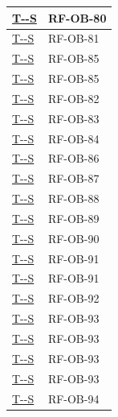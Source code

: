 \documentclass[a4paper,12pt]{article}
\newcounter{testsys}
\newcommand{\systestref}{%
  \hyperlink{T-\arabic{testsys}-S}{T-\arabic{testsys}-S}%
}
\begin{document}
\begin{longtable}{|>{\centering\arraybackslash}p{5cm}|>{\centering\arraybackslash}p{9cm}|}
\stepcounter{testsys}
\systestref & RF-OB-80 \\
\hline

\stepcounter{testsys}
\systestref & RF-OB-81 \\
\hline

\stepcounter{testsys}
\systestref & RF-OB-85 \\
\hline

\stepcounter{testsys}
\systestref & RF-OB-85 \\
\hline

\stepcounter{testsys}
\systestref & RF-OB-82 \\
\hline

\stepcounter{testsys}
\systestref & RF-OB-83 \\
\hline

\stepcounter{testsys}
\systestref & RF-OB-84 \\
\hline

\stepcounter{testsys}
\systestref & RF-OB-86 \\
\hline

\stepcounter{testsys}
\systestref & RF-OB-87 \\
\hline

\stepcounter{testsys}
\systestref & RF-OB-88 \\
\hline

\stepcounter{testsys}
\systestref & RF-OB-89 \\
\hline

\stepcounter{testsys}
\systestref & RF-OB-90 \\
\hline

\stepcounter{testsys}
\systestref & RF-OB-91 \\
\hline

\stepcounter{testsys}
\systestref & RF-OB-91 \\
\hline

\stepcounter{testsys}
\systestref & RF-OB-92 \\
\hline

\stepcounter{testsys}
\systestref & RF-OB-93 \\
\hline

\stepcounter{testsys}
\systestref & RF-OB-93 \\
\hline

\stepcounter{testsys}
\systestref & RF-OB-93 \\
\hline

\stepcounter{testsys}
\systestref & RF-OB-93 \\
\hline

\stepcounter{testsys}
\systestref & RF-OB-94 \\
\hline


\end{longtable}
\end{document}
